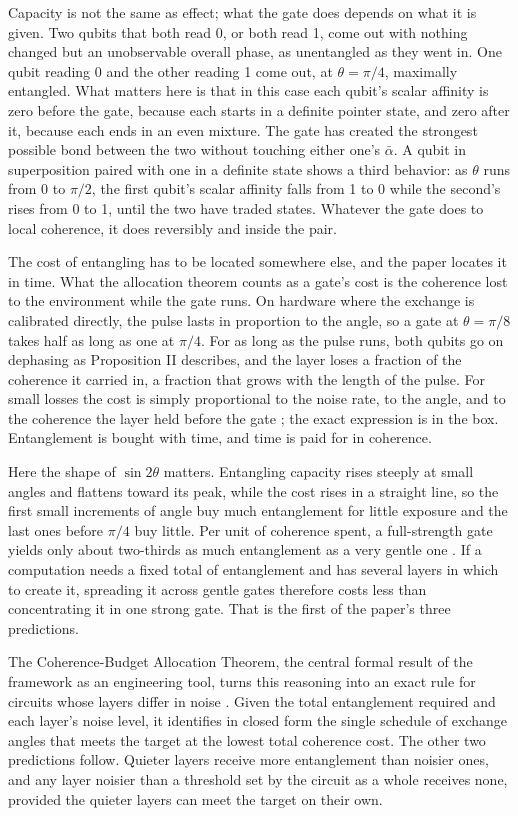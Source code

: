 Capacity is not the same as effect; what the gate does depends on what it is given. Two qubits that both read 0, or both read 1, come out with nothing changed but an unobservable overall phase, as unentangled as they went in. One qubit reading 0 and the other reading 1 come out, at $\theta = \pi/4$, maximally entangled. What matters here is that in this case each qubit's scalar affinity is zero before the gate, because each starts in a definite pointer state, and zero after it, because each ends in an even mixture. The gate has created the strongest possible bond between the two without touching either one's $\bar{\alpha}$. A qubit in superposition paired with one in a definite state shows a third behavior: as $\theta$ runs from 0 to $\pi/2$, the first qubit's scalar affinity falls from 1 to 0 while the second's rises from 0 to 1, until the two have traded states. Whatever the gate does to local coherence, it does reversibly and inside the pair.

The cost of entangling has to be located somewhere else, and the paper locates it in time. What the allocation theorem counts as a gate's cost is the coherence lost to the environment while the gate runs. On hardware where the exchange is calibrated directly, the pulse lasts in proportion to the angle, so a gate at $\theta = \pi/8$ takes half as long as one at $\pi/4$. For as long as the pulse runs, both qubits go on dephasing as Proposition II describes, and the layer loses a fraction of the coherence it carried in, a fraction that grows with the length of the pulse. For small losses the cost is simply proportional to the noise rate, to the angle, and to the coherence the layer held before the gate \citep{AdamsRCT}; the exact expression is in the box. Entanglement is bought with time, and time is paid for in coherence.

Here the shape of $\sin 2\theta$ matters. Entangling capacity rises steeply at small angles and flattens toward its peak, while the cost rises in a straight line, so the first small increments of angle buy much entanglement for little exposure and the last ones before $\pi/4$ buy little. Per unit of coherence spent, a full-strength gate yields only about two-thirds as much entanglement as a very gentle one \citep{AdamsRCT}. If a computation needs a fixed total of entanglement and has several layers in which to create it, spreading it across gentle gates therefore costs less than concentrating it in one strong gate. That is the first of the paper's three predictions.

The Coherence-Budget Allocation Theorem, the central formal result of the framework as an engineering tool, turns this reasoning into an exact rule for circuits whose layers differ in noise \citep{AdamsRCT}. Given the total entanglement required and each layer's noise level, it identifies in closed form the single schedule of exchange angles that meets the target at the lowest total coherence cost. The other two predictions follow. Quieter layers receive more entanglement than noisier ones, and any layer noisier than a threshold set by the circuit as a whole receives none, provided the quieter layers can meet the target on their own.

